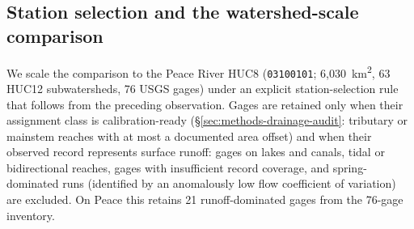 \subsection{Station selection and the watershed-scale comparison}
We scale the comparison to the Peace River HUC8 (\texttt{03100101}; 6{,}030~km\textsuperscript{2}, 63 HUC12 subwatersheds, 76 USGS gages) under an explicit station-selection rule that follows from the preceding observation.
Gages are retained only when their assignment class is calibration-ready (\S\ref{sec:methods-drainage-audit}: tributary or mainstem reaches with at most a documented area offset) and when their observed record represents surface runoff: gages on lakes and canals, tidal or bidirectional reaches, gages with insufficient record coverage, and spring-dominated runs (identified by an anomalously low flow coefficient of variation) are excluded.
On Peace this retains 21 runoff-dominated gages from the 76-gage inventory.

